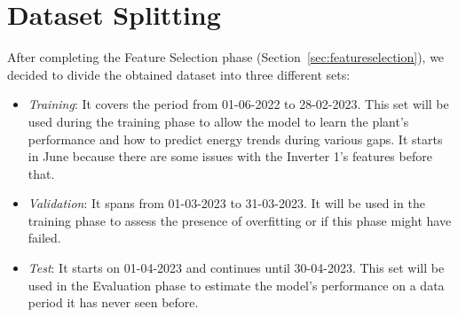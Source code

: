 \section{Dataset Splitting}\label{sec:datasetsplitting}
After completing the Feature Selection phase (Section~\ref{sec:featureselection}),
we decided to divide the obtained
dataset into three different sets:


\begin{itemize}
	\item \textit{Training}: It covers the period from 01-06-2022 to
	      28-02-2023. This set will be used during the training phase
	      to allow the model to learn the plant's performance and how
	      to predict energy trends during various gaps.
	      It starts in June because there are some issues with the
	      Inverter 1's features before that.

	\item \textit{Validation}: It spans from 01-03-2023 to 31-03-2023.
	      It will be used in the training phase to assess the presence
	      of overfitting or if this phase might have failed.

	\item \textit{Test}: It starts on 01-04-2023 and continues
	      until 30-04-2023. This set will be used in the Evaluation phase
	      to estimate the model's performance on a data period it has
	      never seen before.

\end{itemize}

